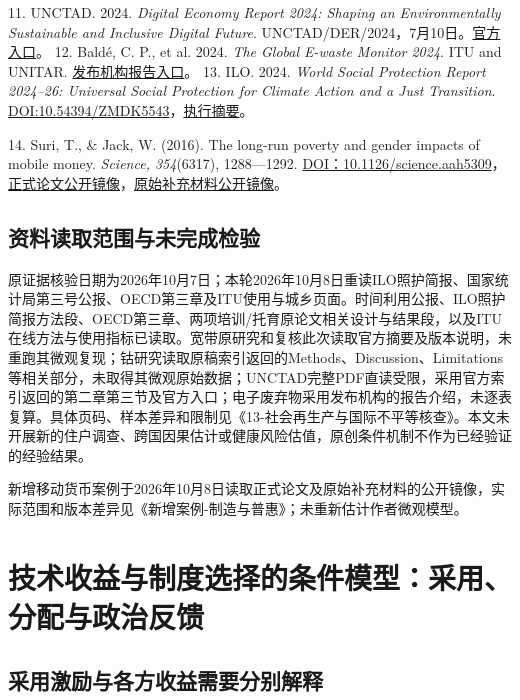 \documentclass[UTF8,fontset=windows,12pt,a4paper,oneside,openany]{ctexbook}
\begin{document}
11. UNCTAD. 2024. \emph{Digital Economy Report 2024: Shaping an Environmentally Sustainable and Inclusive Digital Future}. UNCTAD/DER/2024，7月10日。\href{https://unctad.org/publication/digital-economy-report-2024}{官方入口}。
12. Baldé, C. P., et al. 2024. \emph{The Global E-waste Monitor 2024}. ITU and UNITAR. \href{https://ewastemonitor.info/the-global-e-waste-monitor-2024/}{发布机构报告入口}。
13. ILO. 2024. \emph{World Social Protection Report 2024–26: Universal Social Protection for Climate Action and a Just Transition}. \href{https://doi.org/10.54394/ZMDK5543}{DOI:10.54394/ZMDK5543}，\href{https://www.ilo.org/sites/default/files/2024-09/SOCPRO_WSPR_2024_Executive_Summary_EN_Web.pdf}{执行摘要}。

14. Suri, T., \& Jack, W. (2016). The long-run poverty and gender impacts of mobile money. \emph{Science, 354}(6317), 1288—1292. \href{https://doi.org/10.1126/science.aah5309}{DOI：10.1126/science.aah5309}，\href{https://www.jefftk.com/suri2016.pdf}{正式论文公开镜像}，\href{https://www.jefftk.com/suri2016-supp.pdf}{原始补充材料公开镜像}。

\section{资料读取范围与未完成检验}

原证据核验日期为2026年10月7日；本轮2026年10月8日重读ILO照护简报、国家统计局第三号公报、OECD第三章及ITU使用与城乡页面。时间利用公报、ILO照护简报方法段、OECD第三章、两项培训/托育原论文相关设计与结果段，以及ITU在线方法与使用指标已读取。宽带原研究和复核此次读取官方摘要及版本说明，未重跑其微观复现；钴研究读取原稿索引返回的Methods、Discussion、Limitations等相关部分，未取得其微观原始数据；UNCTAD完整PDF直读受限，采用官方索引返回的第二章第三节及官方入口；电子废弃物采用发布机构的报告介绍，未逐表复算。具体页码、样本差异和限制见《13-社会再生产与国际不平等核查》。本文未开展新的住户调查、跨国因果估计或健康风险估值，原创条件机制不作为已经验证的经验结果。



新增移动货币案例于2026年10月8日读取正式论文及原始补充材料的公开镜像，实际范围和版本差异见《新增案例-制造与普惠》；未重新估计作者微观模型。

\chapter{技术收益与制度选择的条件模型：采用、分配与政治反馈}\label{ch:14}

\section{采用激励与各方收益需要分别解释}
\end{document}
